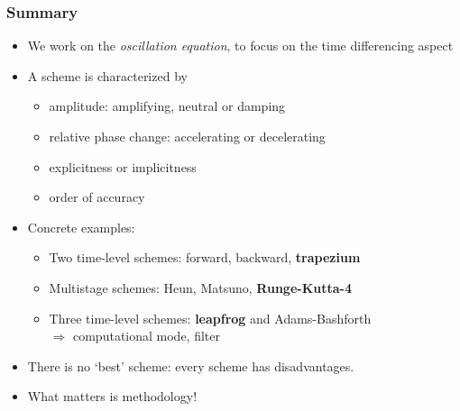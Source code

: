 \documentclass[aspectratio=43,9pt]{beamer}
\begin{document}
\begin{frame}
	\frametitle{Summary}
	\begin{itemize}
		\item We work on the \emph{oscillation equation}, to focus on the time differencing aspect\vspace*{3ex}
		\item A scheme is characterized by
			\begin{itemize}
				\item amplitude: amplifying, neutral or damping
				\item relative phase change: accelerating or decelerating
				\item explicitness or implicitness
				\item order of accuracy\vspace*{3ex}
			\end{itemize}
		\item Concrete examples:
			\begin{itemize}
				\item Two time-level schemes: forward, backward, \textbf{trapezium}
				\item Multistage schemes: Heun, Matsuno, \textbf{Runge-Kutta-4}
				\item Three time-level schemes: \textbf{leapfrog} and Adams-Bashforth\\
					{\hspace*{5mm}$\Rightarrow$ computational mode, filter}\vspace*{3ex}
			\end{itemize}
		\item There is no `best' scheme: every scheme has disadvantages.\vspace*{3ex}
		\item What matters is methodology!
	\end{itemize}
\end{frame}
%
%
\end{document}
